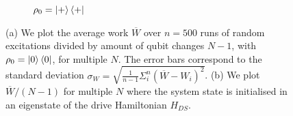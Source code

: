 \begin{figure}[h]
\begin{subfigure}{0.4\textwidth}
	\caption{$\rho_0 = \ket{+}\bra{+}$}
	\label{dt_eigen}
	\end{subfigure}
	\caption{(a) We plot the average work $\overline{W}$ over $n = 500$ runs of random excitations divided by amount of qubit changes $N - 1$, with $\rho_0 = \ket{0}\bra{0}$, for multiple $N$. The error bars correspond to the standard deviation $\sigma_{W} = \sqrt{\frac{1}{n-1} \Sigma_i^n (\overline{W} - W_i)^2}$.
	(b) We plot $\overline{W}/(N-1)$ for multiple $N$ where the system state is initialised in an eigenstate of the drive Hamiltonian $H_{DS}$.}
	\label{dt_dep}
\end{figure}